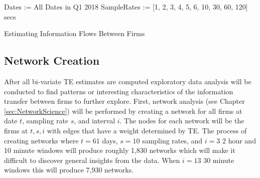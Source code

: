 \begin{algorithm}[H]
\SetAlgoLined
{}

Dates := All Dates in Q1 2018 \;
SampleRates := [1, 2, 3, 4, 5, 6, 10, 30, 60, 120] secs \;


\caption{Estimating Information Flows Between Firms}
\label{alg:EstIF}
\end{algorithm}

\subsection{Network Creation}

After all bi-variate TE estimates are computed exploratory data analysis will be conducted to find patterns or interesting characteristics of the information transfer between firms to further explore.   First, network analysis (see Chapter \ref{sec:NetworkScience}) will be performed by creating a network for all firms at date $t$, sampling rate $s$, and interval $i$. The nodes for each network will be the firms at $t,s,i$ with edges that have a weight determined by TE.  The process of creating networks where $t=61$ days,  $s=10$ sampling rates, and $i=3$ 2 hour and 10 minute windows will produce roughly 1,830 networks which will make it difficult to discover general insights from the data. When $i=13$ 30 minute windows this will produce 7,930 networks.  

